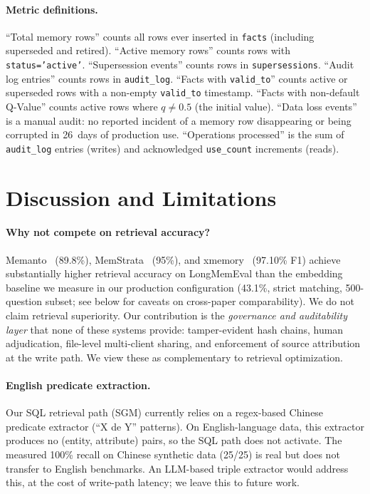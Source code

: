 ﻿\documentclass{article}
\begin{document}
\paragraph{Metric definitions.}
``Total memory rows'' counts all rows ever inserted in \texttt{facts} (including superseded and retired). ``Active memory rows'' counts rows with \texttt{status='active'}. ``Supersession events'' counts rows in \texttt{supersessions}. ``Audit log entries'' counts rows in \texttt{audit\_log}. ``Facts with \texttt{valid\_to}'' counts active or superseded rows with a non-empty \texttt{valid\_to} timestamp. ``Facts with non-default Q-Value'' counts active rows where $q \ne 0.5$ (the initial value). ``Data loss events'' is a manual audit: no reported incident of a memory row disappearing or being corrupted in 26~days of production use. ``Operations processed'' is the sum of \texttt{audit\_log} entries (writes) and acknowledged \texttt{use\_count} increments (reads).

\section{Discussion and Limitations}
\label{sec:disc}

\paragraph{Why not compete on retrieval accuracy?}
Memanto~\citep{memanto} (89.8\%), MemStrata~\citep{memstrata} (95\%), and xmemory~\citep{xmemory} (97.10\% F1) achieve substantially higher retrieval accuracy on LongMemEval than the embedding baseline we measure in our production configuration (43.1\%, strict matching, 500-question subset; see below for caveats on cross-paper comparability). We do not claim retrieval superiority. Our contribution is the \emph{governance and auditability layer} that none of these systems provide: tamper-evident hash chains, human adjudication, file-level multi-client sharing, and enforcement of source attribution at the write path. We view these as complementary to retrieval optimization.

\paragraph{English predicate extraction.}
Our SQL retrieval path (SGM) currently relies on a regex-based Chinese predicate extractor (``X  de  Y'' patterns). On English-language data, this extractor produces no (entity, attribute) pairs, so the SQL path does not activate. The measured 100\% recall on Chinese synthetic data (25/25) is real but does not transfer to English benchmarks. An LLM-based triple extractor would address this, at the cost of write-path latency; we leave this to future work.
\end{document}
